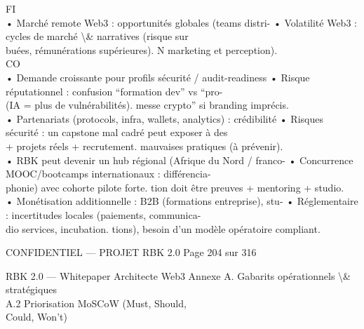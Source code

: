 \documentclass[12pt,landscape,a4paper]{article}
\newenvironment{confidential}
{\begin{tcolorbox}[
    colback=rbkred!5!white,
    colframe=rbkred!75!black,
    title=CONFIDENTIEL,
    fonttitle=\bfseries\color{white},
    coltitle=rbkred!75!black,
    breakable,
    enhanced,
    frame hidden,
    borderline west={2pt}{0pt}{rbkred!75!black}
]}
{\end{tcolorbox}}
\begin{document}
FI\\
• Marché remote Web3 : opportunités globales (teams distri-           • Volatilité Web3 : cycles de marché \textbackslash{}& narratives (risque sur\\
buées, rémunérations supérieures).              N                     marketing et perception).\\
CO\\
• Demande croissante pour profils sécurité / audit-readiness          • Risque réputationnel : confusion “formation dev” vs “pro-\\
(IA = plus de vulnérabilités).                                        messe crypto” si branding imprécis.\\
• Partenariats (protocols, infra, wallets, analytics) : crédibilité   • Risques sécurité : un capstone mal cadré peut exposer à des\\
+ projets réels + recrutement.                                        mauvaises pratiques (à prévenir).\\
• RBK peut devenir un hub régional (Afrique du Nord / franco-         • Concurrence MOOC/bootcamps internationaux : différencia-\\
phonie) avec cohorte pilote forte.                                    tion doit être preuves + mentoring + studio.\\
• Monétisation additionnelle : B2B (formations entreprise), stu-      • Réglementaire : incertitudes locales (paiements, communica-\\
dio services, incubation.                                             tions), besoin d’un modèle opératoire compliant.\\
\vspace{0.5em}
\vspace{0.5em}
\vspace{0.5em}
\vspace{0.5em}
\begin{confidential}CONFIDENTIEL — PROJET RBK 2.0                                  Page 204 sur 316\end{confidential}
RBK 2.0 — Whitepaper Architecte Web3                                                                Annexe A. Gabarits opérationnels \textbackslash{}& stratégiques\\
\vspace{0.5em}
\vspace{0.5em}
\vspace{0.5em}
A.2     Priorisation MoSCoW (Must, Should,\\
Could, Won’t)\\
\end{document}
